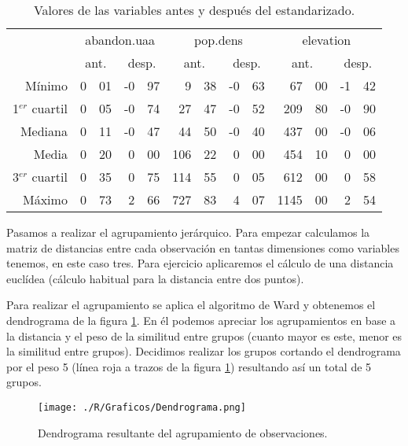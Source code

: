 \documentclass[11pt,a4paper]{article}
\begin{document}
\begin{table}[ht]
\centering
\begin{tabular}{rr@{,}lr@{,}lr@{,}lr@{,}lr@{,}lr@{,}l}
\toprule[0,4mm]
& \multicolumn{4}{c}{abandon.uaa} & \multicolumn{4}{c}{pop.dens} & \multicolumn{4}{c}{elevation}\\
& \multicolumn{2}{c}{ant.} & \multicolumn{2}{c}{desp.} & \multicolumn{2}{c}{ant.} & \multicolumn{2}{c}{desp.} & \multicolumn{2}{c}{ant.} & \multicolumn{2}{c}{desp.}\\
\midrule
Mínimo & 0&01 & -0&97 & 9&38 & -0&63 & 67&00 & -1&42\\ 
1$^{er}$ cuartil & 0&05 & -0&74 & 27&47 & -0&52 & 209&80 & -0&90\\
Mediana & 0&11 & -0&47 & 44&50 & -0&40 & 437&00 & -0&06\\
Media & 0&20 & 0&00 & 106&22 & 0&00 & 454&10 & 0&00\\
3$^{er}$ cuartil & 0&35 & 0&75 & 114&55 & 0&05 & 612&00 & 0&58\\
Máximo & 0&73 & 2&66 & 727&83 & 4&07 & 1145&00 & 2&54\\
\bottomrule[0.4mm]
\end{tabular}
\caption{Valores de las variables antes y después del estandarizado.}
\label{tab:estand}
\end{table}

Pasamos a realizar el agrupamiento jerárquico. Para empezar calculamos la matriz de distancias entre cada observación en tantas dimensiones como variables tenemos, en este caso tres. Para ejercicio aplicaremos el cálculo de una distancia euclídea (cálculo habitual para la distancia entre dos puntos).

Para realizar el agrupamiento se aplica el algoritmo de Ward y obtenemos el dendrograma de la figura \ref{fig:dendro}. En él podemos apreciar los agrupamientos en base a la distancia y el peso de la similitud entre grupos (cuanto mayor es este, menor es la similitud entre grupos). Decidimos realizar los grupos cortando el dendrograma por el peso 5 (línea roja a trazos de la figura \ref{fig:dendro}) resultando así un total de 5 grupos.

\begin{figure}
\centering
\texttt{[image: ./R/Graficos/Dendrograma.png]}
\caption{Dendrograma resultante del agrupamiento de observaciones.}
\label{fig:dendro}
\end{figure}
\end{document}
